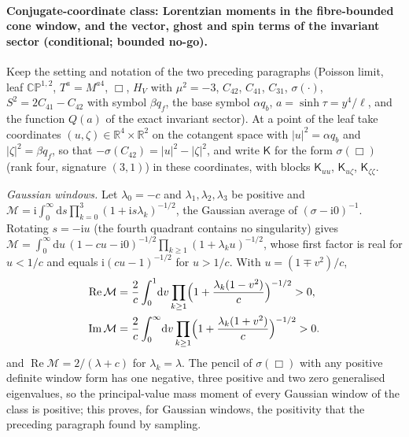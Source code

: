 \paragraph{Conjugate-coordinate class: Lorentzian moments in the fibre-bounded cone window, and the vector, ghost and spin terms of the invariant sector (conditional; bounded no-go).}
Keep the setting and notation of the two preceding paragraphs (Poisson limit, leaf \(\mathbb{CP}^{1,2}\), \(T^a=M^{a4}\), \(\Box\), \(H_V\) with \(\mu^2=-3\), \(C_{42}\), \(C_{41}\), \(C_{31}\), \(\sigma(\cdot)\), \(S^2=2C_{41}-C_{42}\) with symbol \(\beta q_f\), the base symbol \(\alpha q_b\), \(a=\sinh\tau=y^4/\ell\), and the function \(Q(a)\) of the exact invariant sector). At a point of the leaf take coordinates \((u,\zeta)\in\mathbb R^4\times\mathbb R^2\) on the cotangent space with \(|u|^2=\alpha q_b\) and \(|\zeta|^2=\beta q_f\), so that \(-\sigma(C_{42})=|u|^2-|\zeta|^2\), and write \(\mathsf K\) for the form \(\sigma(\Box)\) (rank four, signature \((3,1)\)) in these coordinates, with blocks \(\mathsf K_{uu}\), \(\mathsf K_{u\zeta}\), \(\mathsf K_{\zeta\zeta}\).

\emph{Gaussian windows.} Let \(\lambda_0=-c\) and \(\lambda_1,\lambda_2,\lambda_3\) be positive and \(\mathcal M=\mathrm i\int_0^\infty\mathrm ds\prod_{k=0}^3(1+\mathrm is\lambda_k)^{-1/2}\), the Gaussian average of \((\sigma-\mathrm i0)^{-1}\). Rotating \(s=-\mathrm iu\) (the fourth quadrant contains no singularity) gives \(\mathcal M=\int_0^\infty\mathrm du\,(1-cu-\mathrm i0)^{-1/2}\prod_{k\ge1}(1+\lambda_ku)^{-1/2}\), whose first factor is real for \(u<1/c\) and equals \(\mathrm i(cu-1)^{-1/2}\) for \(u>1/c\). With \(u=(1\mp v^2)/c\),
\[
\begin{aligned}
  \operatorname{Re}\mathcal M
  &=\frac2c\int_0^1\!\mathrm dv
    \prod_{k\ge1}\Bigl(1+\frac{\lambda_k(1-v^2)}c\Bigr)^{-1/2}>0,\\
  \operatorname{Im}\mathcal M
  &=\frac2c\int_0^\infty\!\mathrm dv
    \prod_{k\ge1}\Bigl(1+\frac{\lambda_k(1+v^2)}c\Bigr)^{-1/2}>0.
\end{aligned}
\]
and \(\operatorname{Re}\mathcal M=2/(\lambda+c)\) for \(\lambda_k=\lambda\). The pencil of \(\sigma(\Box)\) with any positive definite window form has one negative, three positive and two zero generalised eigenvalues, so the principal-value mass moment of every Gaussian window of the class is positive; this proves, for Gaussian windows, the positivity that the preceding paragraph found by sampling.

